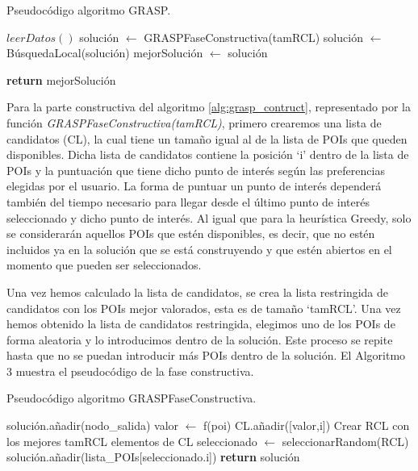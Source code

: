 \begin{algorithm}[H]
	\caption{Pseudocódigo algoritmo GRASP.}
	\label{alg:grasp}
\begin{algorithmic}
	\State $ leerDatos() $
		\State solución $ \gets $ GRASPFaseConstructiva(tamRCL)
		\State  solución $\gets$ BúsquedaLocal(solución)
			\State  mejorSolución $\gets$ solución
		\EndIf
	\EndFor
	
	\State \textbf{return} mejorSolución
	\EndFunction
\end{algorithmic}
\end{algorithm}


Para la parte constructiva del algoritmo  \ref{alg:grasp_contruct}, representado por la función \textit{GRASPFaseConstructiva(tamRCL)}, primero crearemos una lista de candidatos (CL), la cual tiene un tamaño igual al de la lista de POIs que queden disponibles. Dicha lista de candidatos contiene la posición \enquote*{i} dentro de la lista de POIs y la puntuación que tiene dicho punto de interés según las preferencias elegidas por el usuario. La forma de puntuar un punto de interés dependerá también del tiempo necesario para llegar desde el último punto de interés seleccionado y dicho punto de interés. Al igual que para la heurística Greedy, solo se considerarán aquellos POIs que estén disponibles, es decir, que no estén incluidos ya en la solución que se está construyendo y que estén abiertos en el momento que pueden ser seleccionados.\newline

Una vez hemos calculado la lista de candidatos, se crea la lista restringida de candidatos con los POIs mejor valorados, esta es de tamaño \enquote*{tamRCL}. Una vez hemos obtenido la lista de candidatos restringida, elegimos uno de los POIs de forma aleatoria y lo introducimos dentro de la solución. Este proceso se repite hasta que no se puedan introducir más POIs dentro de la solución. El Algoritmo 3 muestra el pseudocódigo de la fase constructiva.\newline
\newpage

\vspace{0.06in}
\begin{algorithm}[H]
	\caption{Pseudocódigo algoritmo GRASPFaseConstructiva.}
	\label{alg:grasp_contruct}
	\begin{algorithmic}
		\State solución.añadir(nodo\_salida)
				\State valor $\gets$ f(poi)
				\State CL.añadir([valor,i])
			\EndFor
			\State Crear RCL con los mejores tamRCL elementos de CL
			\State seleccionado $\gets$ seleccionarRandom(RCL)
			\State solución.añadir(lista\_POIs[seleccionado.i])
		\EndWhile
		\State \textbf{return} solución
		\EndFunction
	\end{algorithmic}
\end{algorithm}


